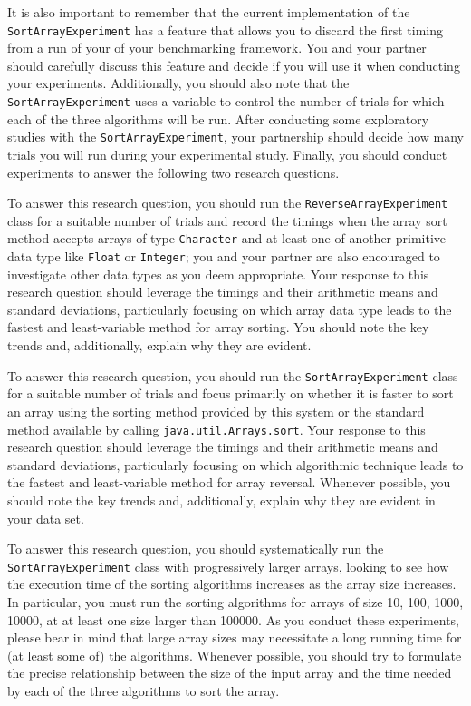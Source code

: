 It is also important to remember that the current implementation of the {\tt SortArrayExperiment} has a feature that
allows you to discard the first timing from a run of your of your benchmarking framework. You and your partner should
carefully discuss this feature and decide if you will use it when conducting your experiments. Additionally, you should
also note that the {\tt SortArrayExperiment} uses a variable to control the number of trials for which each of the three
algorithms will be run. After conducting some exploratory studies with the {\tt SortArrayExperiment}, your partnership
should decide how many trials you will run during your experimental study. Finally, you should conduct experiments to
answer the following two research questions.

 To
answer this research question, you should run the {\tt ReverseArrayExperiment} class for a suitable number of trials and
record the timings when the array sort method accepts arrays of type {\tt Character} and at least one of another
primitive data type like {\tt Float} or {\tt Integer}; you and your partner are also encouraged to investigate other
data types as you deem appropriate. Your response to this research question should leverage the timings and their
arithmetic means and standard deviations, particularly focusing on which array data type leads to the fastest and
least-variable method for array sorting. You should note the key trends and, additionally, explain why they are evident.

 To answer this research question, you should run the {\tt SortArrayExperiment} class for a suitable number
of trials and focus primarily on whether it is faster to sort an array using the sorting method provided by this system
or the standard method available by calling {\tt java.util.Arrays.sort}. Your response to this research question should
leverage the timings and their arithmetic means and standard deviations, particularly focusing on which algorithmic
technique leads to the fastest and least-variable method for array reversal. Whenever possible, you should note the key
trends and, additionally, explain why they are evident in your data set.

 To answer this
research question, you should systematically run the {\tt SortArrayExperiment} class with progressively larger arrays,
looking to see how the execution time of the sorting algorithms increases as the array size increases. In particular,
you must run the sorting algorithms for arrays of size 10, 100, 1000, 10000, at at least one size larger than 100000. As
you conduct these experiments, please bear in mind that large array sizes may necessitate a long running time for (at
least some of) the algorithms. Whenever possible, you should try to formulate the precise relationship between the size
of the input array and the time needed by each of the three algorithms to sort the array.

